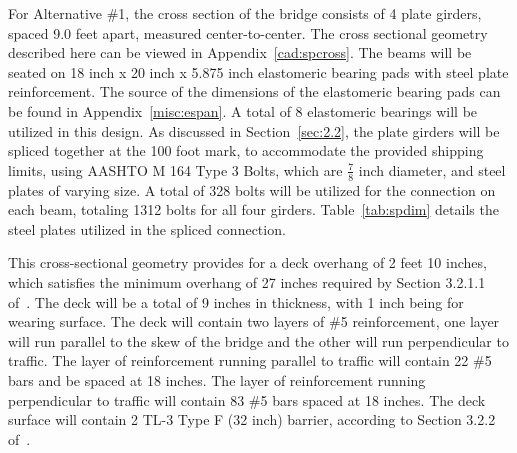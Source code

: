 For Alternative \#1, the cross section of the bridge consists of 4 plate girders, spaced 9.0 feet apart, measured center-to-center. The cross sectional geometry described here can be viewed in Appendix~\ref{cad:spcross}. The beams will be seated on 18 inch x 20 inch x 5.875 inch elastomeric bearing pads with steel plate reinforcement. The source of the dimensions of the elastomeric bearing pads can be found in Appendix~\ref{misc:espan}.  A total of 8 elastomeric bearings will be utilized in this design. As discussed in Section~\ref{sec:2.2}, the plate girders will be spliced together at the 100 foot mark, to accommodate the provided shipping limits, using AASHTO M 164 Type 3 Bolts, which are \(\frac{7}{8}\) inch diameter, and steel plates of varying size. A total of 328 bolts will be utilized for the connection on each beam, totaling 1312 bolts for all four girders. Table~\ref{tab:spdim} details the steel plates utilized in the spliced connection.


\begin{table}[H]
\centering
\caption{Splice Plate Dimensions}\label{tab:spdim}
\vspace{0.5cm}
\end{table}


This cross-sectional geometry provides for a deck overhang of 2 feet 10 inches, which satisfies the minimum overhang of 27 inches required by Section 3.2.1.1 of~\cite{bridgedesignman}. The deck will be a total of  9 inches in thickness, with 1 inch being for wearing surface. The deck will contain two layers of \#5 reinforcement, one layer will run parallel to the skew of the bridge and the other will run perpendicular to traffic. The layer of reinforcement running parallel to traffic will contain 22 \#5 bars and be spaced at 18 inches. The layer of reinforcement running perpendicular to traffic will contain 83 \#5 bars spaced at 18 inches. The deck surface will contain 2 TL-3 Type F (32 inch) barrier, according to Section 3.2.2 of~\cite{bridgedesignman}.


